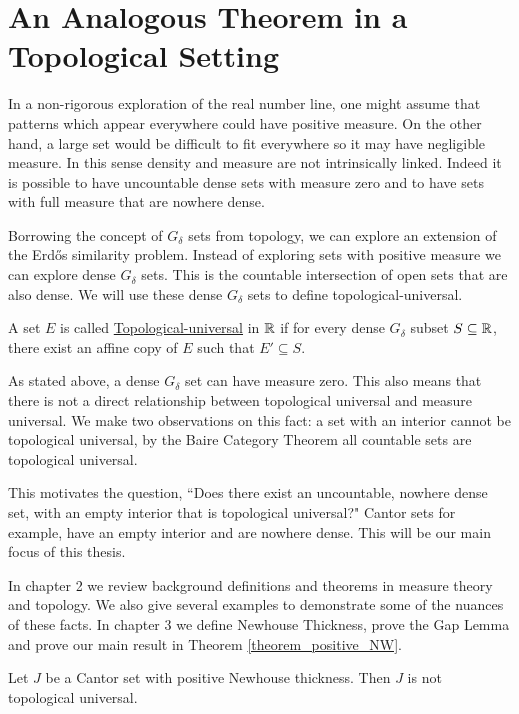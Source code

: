 \section{An Analogous Theorem in a Topological Setting}

In a non-rigorous exploration of the real number line, one might assume that patterns which appear everywhere could have positive measure.  On the other hand, a large set would be difficult to fit everywhere so it may have negligible measure.  In this sense density and measure are not intrinsically linked.  Indeed it is possible to have uncountable dense sets with measure zero and to have sets with full measure that are nowhere dense.  

Borrowing the concept of $G_\delta$ sets from topology, we can explore an extension of the Erd\H{o}s similarity problem.  Instead of exploring sets with positive measure we can explore dense $G_\delta$ sets.  This is the countable intersection of open sets that are also dense.  We will use these dense $G_\delta$ sets to define topological-universal. 

\begin{definition}
    A set $E$ is called \underline{Topological-universal} in $\mathbb{R}$ if for every dense $G_\delta$ subset $S \subseteq \mathbb{R}$, there exist an affine copy of $E$ such that  $E' \subseteq S.$ 
\end{definition}

As stated above, a dense $G_\delta$ set can have measure zero.  This also means that there is not a direct relationship between topological universal and measure universal.  We make two observations on this fact: a set with an interior cannot be topological universal, by the Baire Category Theorem all countable sets are topological universal.   

This motivates the question, ``Does there exist an uncountable, nowhere dense set, with an empty interior that is topological
universal?"  Cantor sets for example, have an empty interior and are nowhere dense. This will be our main focus of this thesis. 

In chapter 2 we review background definitions and theorems in measure theory and topology.  We also give several examples to demonstrate some of the nuances of these facts.  In chapter 3 we define Newhouse Thickness, prove the Gap Lemma and prove our main result in Theorem \ref{theorem_positive_NW}.

\begin{theorem*}
Let $J$ be a Cantor set with positive Newhouse thickness.  Then $J$ is not topological universal.
\end{theorem*}

